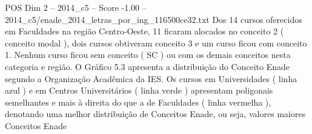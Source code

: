 \begin{textsample}{POS Dim 2 – 2014\_c5 – Score -1.00 – 2014\_c5/enade\_2014\_letras\_por\_ing\_116500ce32.txt}
Dos 14 cursos oferecidos em Faculdades na região Centro-Oeste, 11 ficaram alocados no conceito 2 ( conceito modal ), dois cursos obtiveram conceito 3 e um curso ficou com conceito 1.
Nenhum curso ficou sem conceito ( SC ) ou com os demais conceitos nesta categoria e região.
O Gráfico 5.3 apresenta a distribuição do Conceito Enade segundo a Organização Acadêmica da IES.
Os cursos em Universidades ( linha azul ) e em Centros Universitários ( linha verde ) apresentam poligonais semelhantes e mais à direita do que a de Faculdades ( linha vermelha ), denotando uma melhor distribuição de Conceitos Enade, ou seja, valores maiores Conceitos Enade

\end{textsample}
